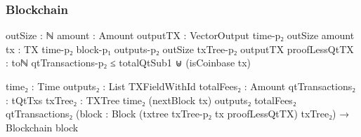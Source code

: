 \documentclass{beamer}
\begin{document}
\begin{frame}
  \frametitle{Blockchain}
\begin{code}

            {outSize : ℕ}
            {amount : Amount}
            {outputTX : VectorOutput time-p₂ outSize amount}
            {tx : TX {time-p₂} {block-p₁}
              {outputs-p₂} {outSize} txTree-p₂ outputTX}
            {proofLessQtTX :
                toℕ qtTransactions-p₂ ≤ totalQtSub1
                ⊎
                (isCoinbase tx)}

            {time₂ : Time}
            {outputs₂ : List TXFieldWithId}
            {totalFees₂ : Amount}
            {qtTransactions₂ : tQtTxs}
            {txTree₂ : TXTree time₂ (nextBlock tx) outputs₂
              totalFees₂ qtTransactions₂}
            (block : Block (txtree txTree-p₂ tx proofLessQtTX)
              txTree₂)
            → Blockchain block

\end{code}
\end{frame}
\end{document}
